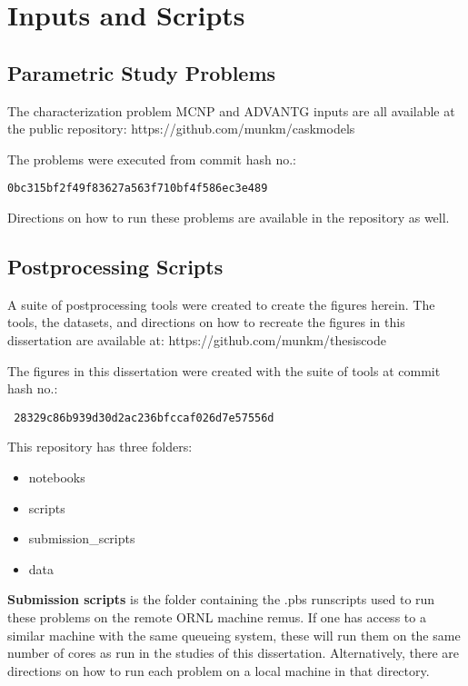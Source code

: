 \section{Inputs and Scripts}
\label{sec:github_codes}

\subsection{Parametric Study Problems}

The characterization problem MCNP and ADVANTG inputs are all available at the
public repository: https://github.com/munkm/caskmodels

The problems were executed from commit hash no.:
\begin{verbatim}
0bc315bf2f49f83627a563f710bf4f586ec3e489
\end{verbatim}
Directions on how to run these problems are available in the repository as well.

\subsection{Postprocessing Scripts}
\label{sec:postprocess}

A suite of postprocessing tools were created to create the figures herein. The
tools, the datasets, and directions on how to recreate the figures in this
dissertation are available at: https://github.com/munkm/thesiscode

The figures in this dissertation were created with the suite of tools at commit
hash no.: \begin{verbatim} 28329c86b939d30d2ac236bfccaf026d7e57556d
\end{verbatim}

This repository has three folders:
\begin{itemize}
  \item notebooks
  \item scripts
  \item submission\_scripts
  \item data
\end{itemize}

\textbf{Submission scripts} is the folder containing the .pbs runscripts used to run
these problems on the remote ORNL machine remus. If one has access to a similar
machine with the same queueing system, these will run them on the same number of
cores as run in the studies of this dissertation. Alternatively, there are
directions on how to run each problem on a local machine in that directory.

